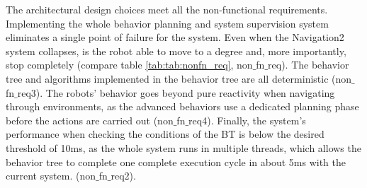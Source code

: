 The architectural design choices meet all the non-functional requirements. 
Implementing the whole behavior planning and system supervision system eliminates a single point of failure for the system. Even when the Navigation2 system collapses, is the robot able to move to a degree and, more importantly, stop completely (compare table \ref{tab:tab:nonfn_req}, non$\_$fn$\_$req). The behavior tree and algorithms implemented in the behavior tree are all deterministic (non$\_$fn$\_$req3). The robots' behavior goes beyond pure reactivity when navigating through environments, as the advanced behaviors use a dedicated planning phase before the actions are carried out (non$\_$fn$\_$req4). 
Finally, the system's performance when checking the conditions of the BT is below the desired threshold of 10ms, as the whole system runs in multiple threads, which allows the behavior tree to complete one complete execution cycle in about 5ms with the current system. (non$\_$fn$\_$req2). 